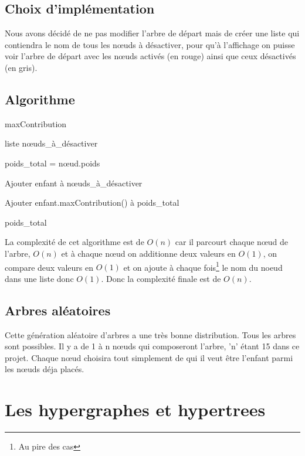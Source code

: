 \documentclass{article}
\begin{document}
	\subsection{Choix d'implémentation}

		Nous avons décidé de ne pas modifier l'arbre de départ mais de créer une liste qui contiendra le nom de tous les nœuds à désactiver, pour qu'à l'affichage on puisse voir l'arbre de départ avec les nœuds activés (en rouge) ainsi que ceux désactivés (en gris).
	
	
		\subsection{Algorithme}
		
		\begin{algorithm}[H]
		\caption{maxContribution}
		\begin{algorithmic}[1]
		\REQUIRE liste nœuds\_à\_désactiver

		\STATE poids\_total = nœud.poids
	
	
		\STATE Ajouter enfant à nœuds\_à\_désactiver

		\ELSE
		\STATE Ajouter enfant.maxContribution() à poids\_total
	
		\ENDIF	
		\ENDFOR

		\RETURN poids\_total

		\end{algorithmic}
		\end{algorithm}
	
		La complexité de cet algorithme est de $O(n)$ car il parcourt chaque nœud de l'arbre, $O(n)$ et à chaque nœud on additionne deux valeurs en $O(1)$, on compare deux valeurs en $O(1)$ et on ajoute à chaque fois\footnote{Au pire des cas} le nom du noeud dans une liste donc $O(1)$. Donc la complexité finale est de $O(n)$.
		
	\subsection{Arbres aléatoires}
	Cette génération aléatoire d'arbres a une très bonne distribution. Tous les arbres sont possibles. Il y a  de 1 à n nœuds qui composeront l'arbre, 'n' étant 15 dans ce projet. Chaque nœud choisira tout simplement de qui il veut être l'enfant parmi les nœuds déja placés.
	
\section{Les hypergraphes et hypertrees}
\end{document}

